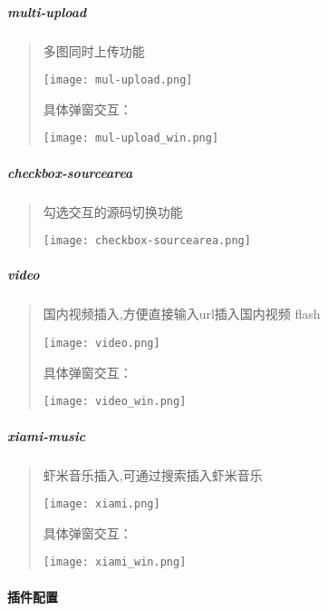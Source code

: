 \documentclass[letterpaper,10pt,english]{sphinxmanual}
\begin{document}
\subparagraph{multi-upload}
\label{relatedproj/editorguide/plugin:multi-upload}\begin{quote}

多图同时上传功能

\texttt{[image: mul-upload.png]}

具体弹窗交互：

\texttt{[image: mul-upload\_win.png]}
\end{quote}


\subparagraph{checkbox-sourcearea}
\label{relatedproj/editorguide/plugin:checkbox-sourcearea}\begin{quote}

勾选交互的源码切换功能

\texttt{[image: checkbox-sourcearea.png]}
\end{quote}


\subparagraph{video}
\label{relatedproj/editorguide/plugin:video}\begin{quote}

国内视频插入,方便直接输入url插入国内视频 flash

\texttt{[image: video.png]}

具体弹窗交互：

\texttt{[image: video\_win.png]}
\end{quote}


\subparagraph{xiami-music}
\label{relatedproj/editorguide/plugin:xiami-music}\begin{quote}

虾米音乐插入,可通过搜索插入虾米音乐

\texttt{[image: xiami.png]}

具体弹窗交互：

\texttt{[image: xiami\_win.png]}
\end{quote}


\paragraph{插件配置}
\label{relatedproj/editorguide/plugin-config::doc}\label{relatedproj/editorguide/plugin-config:editorusage-common-cfg}\label{relatedproj/editorguide/plugin-config:id1}
\end{document}
